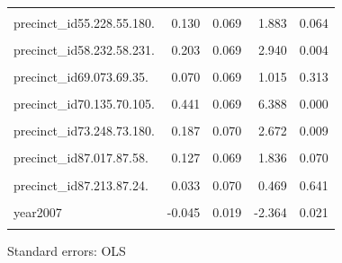\documentclass[
  letterpaper,
  DIV=11,
  numbers=noendperiod]{scrartcl}
\begin{document}
\begin{table}[!h]
\begin{threeparttable}
\begin{tabular}{lrrrr}
\cellcolor{gray!10}{precinct\_id40.244.40.46.} & \cellcolor{gray!10}{0.178} & \cellcolor{gray!10}{0.070} & \cellcolor{gray!10}{2.543} & \cellcolor{gray!10}{0.013}\\
precinct\_id55.228.55.180. & 0.130 & 0.069 & 1.883 & 0.064\\
\cellcolor{gray!10}{precinct\_id58.162.58.98.} & \cellcolor{gray!10}{0.278} & \cellcolor{gray!10}{0.069} & \cellcolor{gray!10}{4.024} & \cellcolor{gray!10}{0.000}\\
precinct\_id58.232.58.231. & 0.203 & 0.069 & 2.940 & 0.004\\
\addlinespace
\cellcolor{gray!10}{precinct\_id67.141.67.123.} & \cellcolor{gray!10}{0.022} & \cellcolor{gray!10}{0.070} & \cellcolor{gray!10}{0.311} & \cellcolor{gray!10}{0.757}\\
precinct\_id69.073.69.35. & 0.070 & 0.069 & 1.015 & 0.313\\
\cellcolor{gray!10}{precinct\_id70.081.70.44.} & \cellcolor{gray!10}{0.062} & \cellcolor{gray!10}{0.069} & \cellcolor{gray!10}{0.899} & \cellcolor{gray!10}{0.372}\\
precinct\_id70.135.70.105. & 0.441 & 0.069 & 6.388 & 0.000\\
\cellcolor{gray!10}{precinct\_id70.221.70.155.} & \cellcolor{gray!10}{0.247} & \cellcolor{gray!10}{0.069} & \cellcolor{gray!10}{3.576} & \cellcolor{gray!10}{0.001}\\
\addlinespace
precinct\_id73.248.73.180. & 0.187 & 0.070 & 2.672 & 0.009\\
\cellcolor{gray!10}{precinct\_id73.251.73.180.} & \cellcolor{gray!10}{0.204} & \cellcolor{gray!10}{0.070} & \cellcolor{gray!10}{2.927} & \cellcolor{gray!10}{0.005}\\
precinct\_id87.017.87.58. & 0.127 & 0.069 & 1.836 & 0.070\\
\cellcolor{gray!10}{precinct\_id87.053.87.68.} & \cellcolor{gray!10}{0.214} & \cellcolor{gray!10}{0.069} & \cellcolor{gray!10}{3.100} & \cellcolor{gray!10}{0.003}\\
precinct\_id87.213.87.24. & 0.033 & 0.070 & 0.469 & 0.641\\
\addlinespace
\cellcolor{gray!10}{precinct\_id98.009.98.12.} & \cellcolor{gray!10}{0.129} & \cellcolor{gray!10}{0.069} & \cellcolor{gray!10}{1.868} & \cellcolor{gray!10}{0.066}\\
year2007 & -0.045 & 0.019 & -2.364 & 0.021\\
\cellcolor{gray!10}{year2011} & \cellcolor{gray!10}{-0.131} & \cellcolor{gray!10}{0.024} & \cellcolor{gray!10}{-5.381} & \cellcolor{gray!10}{0.000}\\
\bottomrule
\end{tabular}
\begin{tablenotes}
\item Standard errors: OLS
\end{tablenotes}
\end{threeparttable}
\end{table}
\end{document}
